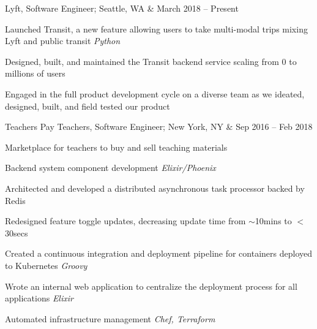 \documentclass[letterpaper]{scrartcl}
\begin{document}
\begin{list1}

\item \begin{tabular1bold} Lyft, Software Engineer; Seattle, WA & March 2018 -- Present \end{tabular1bold}

  \begin{list2}
  \item Launched Transit, a new feature allowing users to take multi-modal trips mixing Lyft and public transit \hfill\emph{Python}

    \begin{list3}
    \item Designed, built, and maintained the Transit backend service scaling from 0 to millions of users
    \end{list3}

  \item Engaged in the full product development cycle on a diverse team as we ideated, designed, built, and field tested our product
  \end{list2}

\item \begin{tabular1bold} Teachers Pay Teachers, Software Engineer; New York, NY & Sep 2016 -- Feb 2018 \end{tabular1bold}

  \begin{list2}
  \item Marketplace for teachers to buy and sell teaching materials

  \item Backend system component development \hfill\emph{Elixir/Phoenix}

    \begin{list3}
    \item Architected and developed a distributed asynchronous task processor backed by Redis
    \item Redesigned feature toggle updates, decreasing update time from $\sim$10mins to $<$30secs
    \end{list3}

  \item Created a continuous integration and deployment pipeline for containers deployed to Kubernetes \hfill\emph{Groovy}
  \item Wrote an internal web application to centralize the deployment process for all applications \hfill\emph{Elixir}
  \item Automated infrastructure management \hfill\emph{Chef, Terraform}
  \end{list2}


\end{list1}
\end{document}
